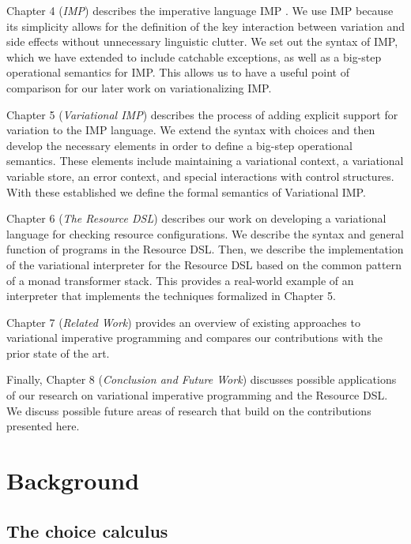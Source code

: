\documentclass[12pt,oneside]{book}
\begin{document}
Chapter 4 (\emph{IMP}) describes the imperative language IMP \cite{winskel1993formal,nipkow1998winskel,nipkow2014concrete}.
We use IMP because its simplicity allows for the definition of the key
interaction between variation and side effects without unnecessary linguistic
clutter. We set out the syntax of IMP, which we have extended to include catchable
exceptions, as well as a big-step operational semantics for IMP. This allows us
to have a useful point of comparison for our later work on variationalizing IMP.

Chapter 5 (\emph{Variational IMP}) describes the process of adding explicit support
for variation to the IMP language. We extend the syntax with choices and then
develop the necessary elements in order to define a big-step operational semantics.
These elements include maintaining a variational context, a variational variable store,
an error context, and special interactions with control structures. With these established
we define the formal semantics of Variational IMP.

Chapter 6 (\emph{The Resource DSL}) describes our work on developing a variational
language for checking resource configurations. We describe the syntax and general function
of programs in the Resource DSL. Then, we describe the implementation of the variational
interpreter for the Resource DSL based on the common pattern of a monad transformer stack.
This provides a real-world example of an interpreter that implements the techniques formalized
in Chapter 5.

Chapter 7 (\emph{Related Work}) provides an overview of existing approaches to
variational imperative programming and compares our contributions with the prior
state of the art.

Finally, Chapter 8 (\emph{Conclusion and Future Work}) discusses possible applications
of our research on variational imperative programming and the Resource DSL. We discuss
possible future areas of research that build on the contributions presented here.


\chapter{Background}
\label{ch:bg}

\section{The choice calculus}
\end{document}
